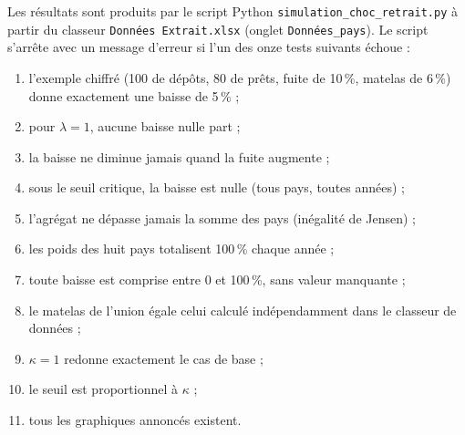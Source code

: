 \documentclass[11pt,a4paper]{article}
\begin{document}
	Les résultats sont produits par le script Python \texttt{simulation\_choc\_retrait.py} à partir du classeur \texttt{Données Extrait.xlsx} (onglet \texttt{Données\_pays}). Le script s'arrête avec un message d'erreur si l'un des onze tests suivants échoue :
	\begin{enumerate}[nosep,label=G\arabic*.]
		\item l'exemple chiffré (100 de dépôts, 80 de prêts, fuite de 10\,\%, matelas de 6\,\%) donne exactement une baisse de 5\,\% ;
		\item pour $\lambda=1$, aucune baisse nulle part ;
		\item la baisse ne diminue jamais quand la fuite augmente ;
		\item sous le seuil critique, la baisse est nulle (tous pays, toutes années) ;
		\item l'agrégat ne dépasse jamais la somme des pays (inégalité de Jensen) ;
		\item les poids des huit pays totalisent 100\,\% chaque année ;
		\item toute baisse est comprise entre 0 et 100\,\%, sans valeur manquante ;
		\item le matelas de l'union égale celui calculé indépendamment dans le classeur de données ;
		\item $\kappa=1$ redonne exactement le cas de base ;
		\item le seuil est proportionnel à $\kappa$ ;
		\item tous les graphiques annoncés existent.
	\end{enumerate}
	
\end{document}
